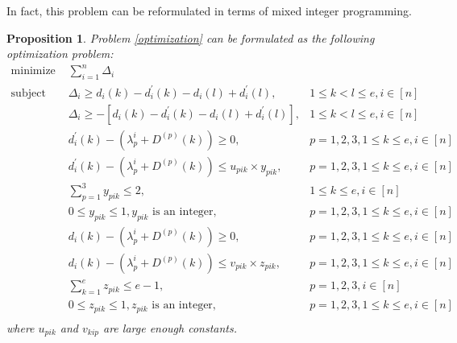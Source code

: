 \documentclass[12pt]{extarticle}
\numberwithin{theorem}{section}
\newtheorem{proposition}[theorem]{Proposition}
\newcommand{\RR}{\mathbb{R}}
\newcommand{\Tn}{\mathcal{U}_m}
\begin{document}
In fact, this problem can be reformulated in terms of mixed integer programming.
\begin{proposition}\label{polytope_projection}
Problem
\ref{optimization} can be formulated as the following optimization problem:
\begin{align}
\text{minimize }& {}\sum_{i=1}^{n} \Delta_i &\\\nonumber
\text{subject to: } &\Delta_i \ge
d_{i}(k)-d^{'}_{i}(k)-d_{i}(l)+d^{'}_{i}(l), & 1 \le k < l \le e, i\in [n]\\\nonumber
&\Delta_i \ge
-[d_{i}(k)-d^{'}_{i}(k)-d_{i}(l)+d^{'}_{i}(l)], & 1 \le k < l \le e,i\in [n]\\\nonumber
&d^{'}_{i}(k) - (\lambda_p^i+D^{(p)}(k)) \ge 0, & p=1,2,3,1\le k \le e, i\in [n]\\\nonumber
&d^{'}_{i}(k)-(\lambda_p^i+D^{(p)}(k) )\le u_{pik} \times y_{pik}, & p=1,2,3, 1\le k \le e, i\in [n] \\\nonumber
&\sum_{p=1}^3 y_{pik} \le 2, & 1\le k \le e,  i\in [n] \\\nonumber
&0\le y_{pik}\le 1, y_{pik} \text{ is an integer}, & p=1,2,3, 1\le k \le e, i\in [n] \\\nonumber
&d_i (k) - (\lambda_p^i +  D^{(p)}(k))\ge 0, & p=1,2,3,1\le k \le e, i\in [n] \\\nonumber
&d_{i}(k)-(\lambda_p^i+D^{(p)}(k)) \le v_{pik}\times z_{pik}, & p=1,2,3, 1\le k \le e, i\in [n] \\\nonumber
&\sum_{k=1}^e z_{pik} \le e-1, & p=1,2,3,i\in [n] \\\nonumber
&0\le z_{pik}\le 1, z_{pik} \text{ is an integer},& p=1,2,3, 1\le k \le e, i\in [n] \\\nonumber
\end{align}
where $u_{pik}$ and $v_{kip}$ are large enough constants.
\end{proposition}
\end{document}
